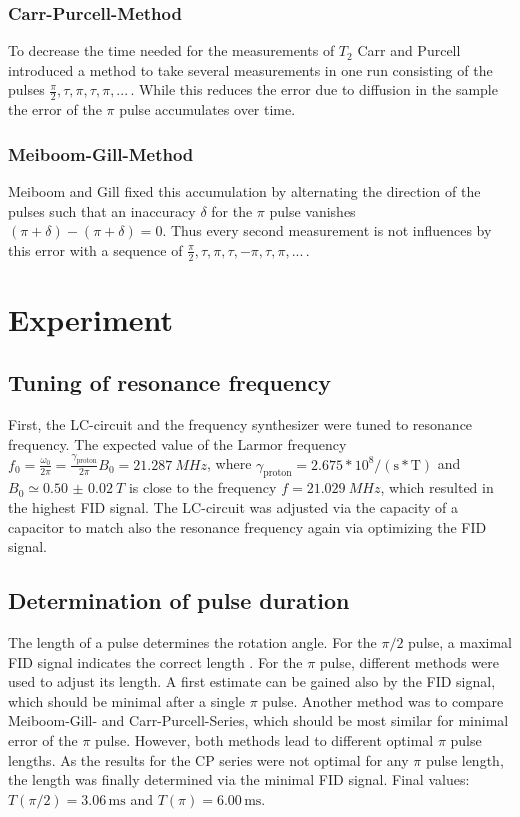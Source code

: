 \documentclass[a4paper]{scrartcl}
\numberwithin{equation}{section}
\numberwithin{figure}{section}
\numberwithin{table}{section}
\begin{document}
\subsubsection*{Carr-Purcell-Method}
To decrease the time needed for the measurements of $T_2$ Carr and Purcell \cite{purcell} introduced a method to take several measurements in one run consisting of the pulses $\frac{\pi}{2},\tau,\pi,\tau,\pi,...\,$. While this reduces the error due to diffusion in the sample the error of the $\pi$ pulse accumulates over time.

\subsubsection*{Meiboom-Gill-Method}
Meiboom and Gill fixed this accumulation by alternating the direction of the pulses such that an inaccuracy $\delta$ for the $\pi$ pulse vanishes $(\pi+\delta)-(\pi+\delta)=0$. Thus every second measurement is not influences by this error with a sequence of $\frac{\pi}{2},\tau,\pi,\tau,-\pi,\tau,\pi,...\,$.

\clearpage
\section{Experiment}
\subsection{Tuning of resonance frequency}
First, the LC-circuit and the frequency synthesizer were tuned to resonance frequency. The expected value of the Larmor frequency $f_0=\frac{\omega_0}{2\pi}=\frac{\gamma_\text{proton}}{2\pi} B_0 =  \SI{21.287}{MHz}$, where $\gamma_\text{proton}=2.675*10^8/(\text{s}*\text{T})$ and $B_0\simeq\SI{0.50(2)}{T}$ \cite{hersteller} is close to the frequency $f=\SI{21.029}{MHz}$, which resulted in the highest FID signal. The LC-circuit was adjusted via the capacity of a capacitor to match also the resonance frequency again via optimizing the FID signal.
\subsection{Determination of pulse duration}
The length of a pulse determines the rotation angle. For the $\pi/2$ pulse, a maximal FID signal indicates the correct length . For the $\pi$ pulse, different methods were used to adjust its length. A first estimate can be gained also by the FID signal, which should be minimal after a single $\pi$ pulse. Another method was to compare Meiboom-Gill- and Carr-Purcell-Series, which should be most similar for minimal error of the $\pi$ pulse. However, both methods lead to different optimal $\pi$ pulse lengths. As the results for the CP series were not optimal for any $\pi$ pulse length, the length was finally determined via the minimal FID signal. Final values: $T\left(\pi/2\right) = 3.06\,\text{ms}$ and $T\left(\pi\right) = 6.00\,\text{ms}$. 
\end{document}
